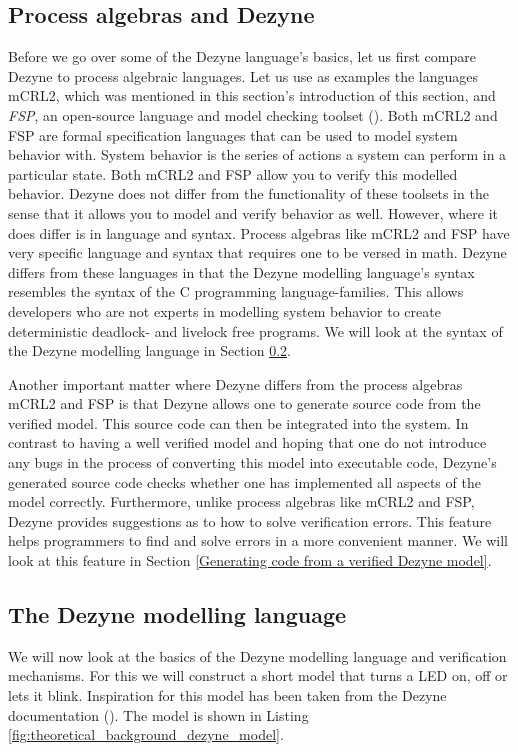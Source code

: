 \documentclass[12pt]{scrreprt}
\begin{document}
\subsection{Process algebras and Dezyne}
Before we go over some of the Dezyne language's basics, let us first compare Dezyne to process algebraic languages. Let us use as examples the languages mCRL2, which was mentioned in this section's introduction of this section, and \textit{FSP}, an open-source language and model checking toolset (\cite{ltsa}). Both mCRL2 and FSP are formal specification languages that can be used to model system behavior with. System behavior is the series of actions a system can perform in a particular state. Both mCRL2 and FSP allow you to verify this modelled behavior. Dezyne does not differ from the functionality of these toolsets in the sense that it allows you to model and verify behavior as well. However, where it does differ is in language and syntax. Process algebras like mCRL2 and FSP have very specific language and syntax that requires one to be versed in math. Dezyne differs from these languages in that the Dezyne modelling language's syntax resembles the syntax of the C programming language-families. This allows developers who are not experts in modelling system behavior to create deterministic deadlock- and livelock free programs. We will look at the syntax of the Dezyne modelling language in Section \ref{The Dezyne toolset and the Dezyne modelling language}.
\par
Another important matter where Dezyne differs from the process algebras mCRL2 and FSP is that Dezyne allows one to generate source code from the verified model. This source code can then be integrated into the system. In contrast to having a well verified model and hoping that one do not introduce any bugs in the process of converting this model into executable code, Dezyne's generated source code checks whether one has implemented all aspects of the model correctly. Furthermore, unlike process algebras like mCRL2 and FSP, Dezyne provides suggestions as to how to solve verification errors. This feature helps programmers to find and solve errors in a more convenient manner. We will look at this feature in Section \ref{Generating code from a verified Dezyne model}.

\subsection{The Dezyne modelling language}
\label{The Dezyne toolset and the Dezyne modelling language}
We will now look at the basics of the Dezyne modelling language and verification mechanisms. For this we will construct a short model that turns a LED on, off or lets it blink. Inspiration for this model has been taken from the Dezyne documentation (\cite{dzntut}). The model is shown in Listing \ref{fig:theoretical_background_dezyne_model}.
\end{document}
